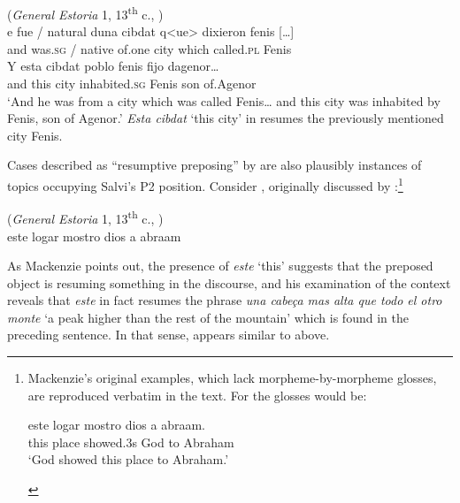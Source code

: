 \documentclass[output=paper]{LSP/langsci}
\begin{document}
\ea\label{ex:poole:3}
(\textit{General Estoria} 1, 13\textsuperscript{th} c., \citealt[(16)]{Sitaridou2011})\\
\gll  e fue / natural duna cibdat q{\textless}ue{\textgreater} dixieron fenis […] \\
      and was.\textsc{sg} / native of.one city which called.\textsc{pl} Fenis\\
\gll Y esta cibdat poblo fenis fijo dagenor…\\
and this city inhabited.\textsc{sg} Fenis son of.Agenor\\
\glt ‘And he was from a city which was called Fenis… and this city was inhabited by Fenis, son of Agenor.’
\z
\textit{Esta cibdat} ‘this city’ in  resumes the previously mentioned city Fenis.

Cases described as ``resumptive preposing'' by \citet{Mackenzie2010} are also plausibly instances of topics occupying Salvi’s P2 position.  Consider , originally discussed by \citet{Fontana1993}:\footnote{Mackenzie’s original examples, which lack morpheme-by-morpheme glosses, are reproduced verbatim in the text.  For  the glosses would be:

\begin{exe}
\gll este logar mostro dios a abraam.\\
this place showed.3s God to Abraham\\
\glt ‘God showed this place to Abraham.’
\end{exe}
} 

\ea%
    \label{ex:poole:4}
(\textit{General Estoria} 1, 13\textsuperscript{th} c., \citealt[(14)]{Mackenzie2010})\\
        este logar mostro dios a abraam  \\
    \z

\noindent As Mackenzie points out, the presence of \textit{este} ‘this’ suggests that the preposed object is resuming something in the discourse, and his examination of the context reveals that \textit{este} in fact resumes the phrase \textit{una cabeça mas alta que todo el otro monte} ‘a peak higher than the rest of the mountain’ which is found in the preceding sentence.  In that sense,  appears similar to  above.
\end{document}
